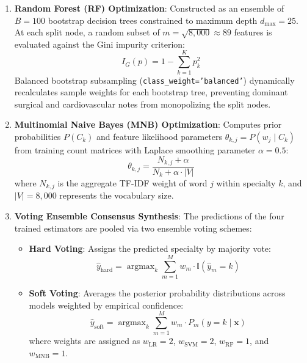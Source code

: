 \begin{enumerate}
    \item \textbf{Random Forest (RF) Optimization}:
    Constructed as an ensemble of $B = 100$ bootstrap decision trees constrained to maximum depth $d_{\text{max}} = 25$. At each split node, a random subset of $m = \sqrt{8,000} \approx 89$ features is evaluated against the Gini impurity criterion:
    \begin{equation}
        I_G(p) = 1 - \sum_{k=1}^{K} p_k^2
    \end{equation}
    Balanced bootstrap subsampling (\texttt{class\_weight='balanced'}) dynamically recalculates sample weights for each bootstrap tree, preventing dominant surgical and cardiovascular notes from monopolizing the split nodes.

    \item \textbf{Multinomial Naive Bayes (MNB) Optimization}:
    Computes prior probabilities $P(C_k)$ and feature likelihood parameters $\theta_{k,j} = P(w_j \mid C_k)$ from training count matrices with Laplace smoothing parameter $\alpha = 0.5$:
    \begin{equation}
        \theta_{k,j} = \frac{N_{k,j} + \alpha}{N_k + \alpha \cdot |V|}
    \end{equation}
    where $N_{k,j}$ is the aggregate TF-IDF weight of word $j$ within specialty $k$, and $|V| = 8,000$ represents the vocabulary size.

    \item \textbf{Voting Ensemble Consensus Synthesis}:
    The predictions of the four trained estimators are pooled via two ensemble voting schemes:
    \begin{itemize}
        \item \textbf{Hard Voting}: Assigns the predicted specialty by majority vote:
        \begin{equation}
            \hat{y}_{\text{hard}} = \operatorname{argmax}_k \sum_{m=1}^{M} w_m \cdot \mathbb{I}(\hat{y}_m = k)
        \end{equation}
        \item \textbf{Soft Voting}: Averages the posterior probability distributions across models weighted by empirical confidence:
        \begin{equation}
            \hat{y}_{\text{soft}} = \operatorname{argmax}_k \sum_{m=1}^{M} w_m \cdot P_m(y = k \mid \mathbf{x})
        \end{equation}
        where weights are assigned as $w_{\text{LR}} = 2$, $w_{\text{SVM}} = 2$, $w_{\text{RF}} = 1$, and $w_{\text{MNB}} = 1$.
    \end{itemize}
\end{enumerate}

